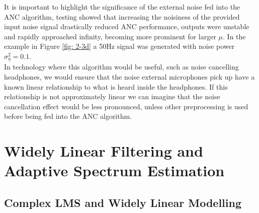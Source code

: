 \documentclass[12pt]{article}
\numberwithin{equation}{section}
\begin{document}
			It is important to highlight the significance of the external noise fed into the ANC algorithm, testing showed that increasing the noisiness of the provided input noise signal drastically reduced ANC performance, outputs were unstable and rapidly approached infinity, becoming more prominent for larger $\mu$. In the example in Figure \ref{fig: 2-3d} a 50Hz signal was generated with noise power $\sigma_\eta^{ 2}=0.1$.\\
			 In technology where this algorithm would be useful, such as noise cancelling headphones, we would ensure that the noise external microphones pick up have a known linear relationship to what is heard inside the headphones. If this relationship is not approximately linear we can imagine that the noise cancellation effect would be less pronounced, unless other preprocessing is used before being fed into the ANC algorithm.
	
\pagebreak
\section{Widely Linear Filtering and Adaptive Spectrum Estimation} \label{sec: 3-WLASE}
	\subsection{Complex LMS and Widely Linear Modelling} \label{sec: 3-1-CLMS-ACLMS}
\end{document}
